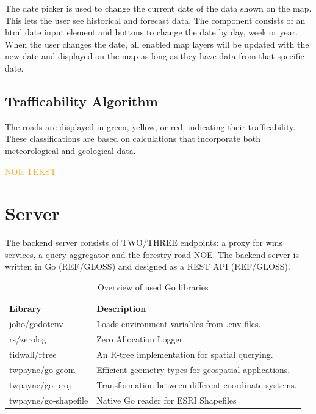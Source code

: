 The date picker is used to change the current date of the data shown on the map. This lets the user see historical and forecast data. The component consists of an \acrshort{html} date input element and buttons to change the date by day, week or year. When the user changes the date, all enabled map layers will be updated with the new date and displayed on the map as long as they have data from that specific date.

\subsection{Trafficability Algorithm} 

The roads are displayed in green, yellow, or red, indicating their trafficability. These classifications are based on calculations that incorporate both meteorological and geological data.

\textcolor{orange}{NOE TEKST}

\section{Server}

The backend server consists of TWO/THREE endpoints: a proxy for \Gls{wms} services, a query aggregator and the forestry road NOE. 
The backend server is written in Go (REF/GLOSS) and designed as a REST API (REF/GLOSS). 

\begin{table}[h]
    \centering
    \begin{tabular}{|l|l|}
        \hline
        \textbf{Library} & \textbf{Description} \\
        \hline
        joho/godotenv & Loads environment variables from .env files. \\
        rs/zerolog & Zero Allocation Logger. \\
        tidwall/rtree & An R-tree implementation for spatial querying. \\
        twpayne/go-geom & Efficient geometry types for geospatial applications. \\
        twpayne/go-proj & Transformation between different coordinate systems. \\
        twpayne/go-shapefile & Native Go reader for ESRI Shapefiles \\
        \hline
    \end{tabular}
    \caption{Overview of used Go libraries}
    \label{tab:go_libraries}
\end{table}

